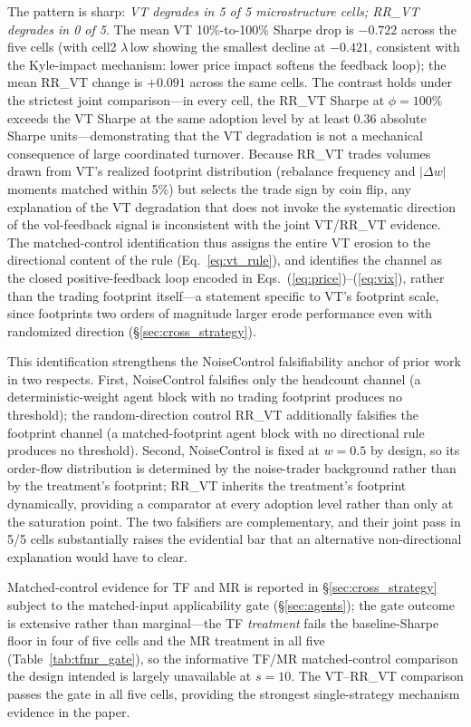 \documentclass[12pt,a4paper]{article}
\begin{document}
The pattern is sharp: \emph{VT degrades in 5 of 5 microstructure cells; RR\_VT degrades in 0 of 5}. The mean VT 10\%-to-100\% Sharpe drop is $-0.722$ across the five cells (with cell2 $\lambda$\,low showing the smallest decline at $-0.421$, consistent with the Kyle-impact mechanism: lower price impact softens the feedback loop); the mean RR\_VT change is $+0.091$ across the same cells. The contrast holds under the strictest joint comparison---in every cell, the RR\_VT Sharpe at $\phi = 100\%$ exceeds the VT Sharpe at the same adoption level by at least 0.36 absolute Sharpe units---demonstrating that the VT degradation is not a mechanical consequence of large coordinated turnover. Because RR\_VT trades volumes drawn from VT's realized footprint distribution (rebalance frequency and $|\Delta w|$ moments matched within 5\%) but selects the trade sign by coin flip, any explanation of the VT degradation that does not invoke the systematic direction of the vol-feedback signal is inconsistent with the joint VT/RR\_VT evidence. The matched-control identification thus assigns the entire VT erosion to the directional content of the rule (Eq.~\ref{eq:vt_rule}), and identifies the channel as the closed positive-feedback loop encoded in Eqs.~(\ref{eq:price})--(\ref{eq:vix}), rather than the trading footprint itself---a statement specific to VT's footprint scale, since footprints two orders of magnitude larger erode performance even with randomized direction (\S\ref{sec:cross_strategy}).

This identification strengthens the NoiseControl falsifiability anchor of prior work in two respects. First, NoiseControl falsifies only the headcount channel (a deterministic-weight agent block with no trading footprint produces no threshold); the random-direction control RR\_VT additionally falsifies the footprint channel (a matched-footprint agent block with no directional rule produces no threshold). Second, NoiseControl is fixed at $w = 0.5$ by design, so its order-flow distribution is determined by the noise-trader background rather than by the treatment's footprint; RR\_VT inherits the treatment's footprint dynamically, providing a comparator at every adoption level rather than only at the saturation point. The two falsifiers are complementary, and their joint pass in 5/5 cells substantially raises the evidential bar that an alternative non-directional explanation would have to clear.

Matched-control evidence for TF and MR is reported in \S\ref{sec:cross_strategy} subject to the matched-input applicability gate (\S\ref{sec:agents}); the gate outcome is extensive rather than marginal---the TF \emph{treatment} fails the baseline-Sharpe floor in four of five cells and the MR treatment in all five (Table~\ref{tab:tfmr_gate}), so the informative TF/MR matched-control comparison the design intended is largely unavailable at $s = 10$. The VT--RR\_VT comparison passes the gate in all five cells, providing the strongest single-strategy mechanism evidence in the paper.
\end{document}
